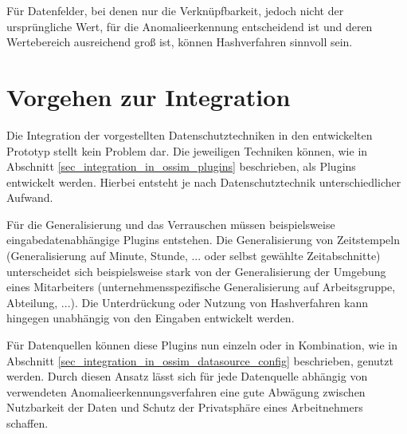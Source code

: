 Für Datenfelder, bei denen nur die Verknüpfbarkeit, jedoch nicht der ursprüngliche Wert, für die Anomalieerkennung entscheidend ist und deren Wertebereich ausreichend groß ist, können Hashverfahren sinnvoll sein.

\section{Vorgehen zur Integration}

Die Integration der vorgestellten Datenschutztechniken in den entwickelten Prototyp stellt kein Problem dar. Die jeweiligen Techniken können, wie in Abschnitt \ref{sec_integration_in_ossim_plugins} beschrieben, als Plugins entwickelt werden. Hierbei entsteht je nach Datenschutztechnik unterschiedlicher Aufwand.

Für die Generalisierung und das Verrauschen müssen beispielsweise eingabedatenabhängige Plugins entstehen. Die Generalisierung von Zeitstempeln (Generalisierung auf Minute, Stunde, ... oder selbst gewählte Zeitabschnitte) unterscheidet sich beispielsweise stark von der Generalisierung der Umgebung eines Mitarbeiters (unternehmensspezifische Generalisierung auf Arbeitsgruppe, Abteilung, ...). Die Unterdrückung oder Nutzung von Hashverfahren kann hingegen unabhängig von den Eingaben entwickelt werden.

Für Datenquellen können diese Plugins nun einzeln oder in Kombination, wie in Abschnitt \ref{sec_integration_in_ossim_datasource_config} beschrieben, genutzt werden. Durch diesen Ansatz lässt sich für jede Datenquelle abhängig von verwendeten Anomalieerkennungsverfahren eine gute Abwägung zwischen Nutzbarkeit der Daten und Schutz der Privatsphäre eines Arbeitnehmers schaffen.